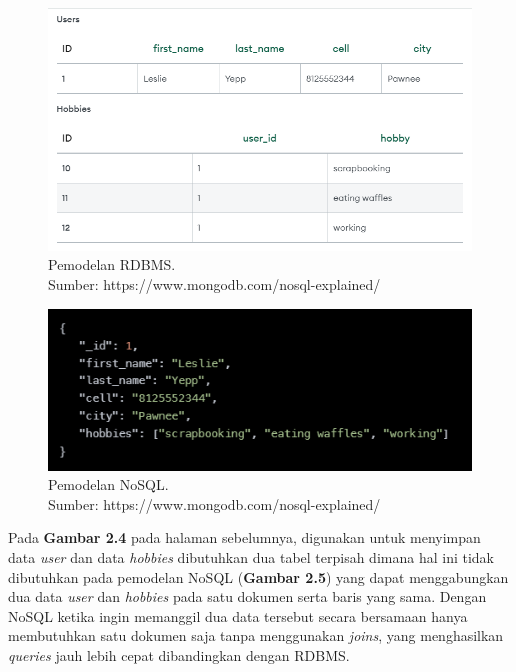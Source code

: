 \begin{figure}[H]
	\centering
	\includegraphics[width=12cm]{gambar/mongoDB1.png}
	\caption{Pemodelan RDBMS. \\ Sumber: https://www.mongodb.com/nosql-explained/}
	\label{Gambar:registrasi blueprint}
\end{figure}

\begin{figure}[H]
	\centering
	\includegraphics[width=12cm]{gambar/mongoDB2.png}
	\caption{Pemodelan NoSQL. \\ Sumber: https://www.mongodb.com/nosql-explained/}
	\label{Gambar:registrasi blueprint}
\end{figure}

Pada \textbf{Gambar 2.4} pada halaman sebelumnya, digunakan untuk menyimpan data \emph{user} dan data \emph{hobbies} dibutuhkan dua tabel terpisah dimana hal ini tidak dibutuhkan pada pemodelan NoSQL (\textbf{Gambar 2.5}) yang dapat menggabungkan dua data \emph{user} dan \emph{hobbies} pada satu dokumen serta baris yang sama. Dengan NoSQL ketika ingin memanggil dua data tersebut secara bersamaan hanya membutuhkan satu dokumen saja tanpa menggunakan \emph{joins}, yang menghasilkan \emph{queries} jauh lebih cepat dibandingkan dengan RDBMS.

